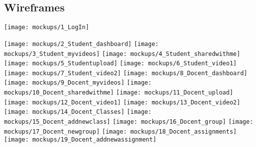 \begin{appendices}
\chapter{Wireframes}
\texttt{[image: mockups/1\_LogIn]}

\texttt{[image: mockups/2\_Student\_dashboard]}
\texttt{[image: mockups/3\_Student\_myvideos]}
\texttt{[image: mockups/4\_Student\_sharedwithme]}
\texttt{[image: mockups/5\_Studentupload]}
\texttt{[image: mockups/6\_Student\_video1]}
\texttt{[image: mockups/7\_Student\_video2]}
\texttt{[image: mockups/8\_Docent\_dashboard]}
\texttt{[image: mockups/9\_Docent\_myvideos]}
\texttt{[image: mockups/10\_Docent\_sharedwithme]}
\texttt{[image: mockups/11\_Docent\_upload]}
\texttt{[image: mockups/12\_Docent\_video1]}
\texttt{[image: mockups/13\_Docent\_video2]}
\texttt{[image: mockups/14\_Docent\_Classes]}
\texttt{[image: mockups/15\_Docent\_addnewclass]}
\texttt{[image: mockups/16\_Docent\_group]}
\texttt{[image: mockups/17\_Docent\_newgroup]}
\texttt{[image: mockups/18\_Docent\_assignments]}
\texttt{[image: mockups/19\_Docent\_addnewassignment]}

%
\end{appendices}
